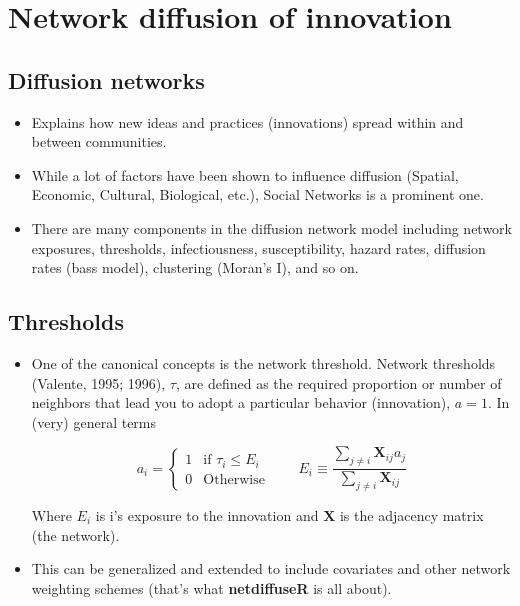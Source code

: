 \documentclass[]{book}
\begin{document}
\hypertarget{network-diffusion-of-innovation}{%
\section{Network diffusion of innovation}\label{network-diffusion-of-innovation}}

\hypertarget{diffusion-networks}{%
\subsection{Diffusion networks}\label{diffusion-networks}}

\begin{itemize}
\item
  Explains how new ideas and practices (innovations) spread within and between
  communities.
\item
  While a lot of factors have been shown to influence diffusion (Spatial,
  Economic, Cultural, Biological, etc.), Social Networks is a prominent one.
\item
  There are many components in the diffusion network model including network exposures, thresholds, infectiousness, susceptibility, hazard rates, diffusion rates (bass model), clustering (Moran's I), and so on.
\end{itemize}

\hypertarget{thresholds}{%
\subsection{Thresholds}\label{thresholds}}

\begin{itemize}
\item
  One of the canonical concepts is the network threshold. Network thresholds (Valente, 1995; 1996), \(\tau\), are defined as the required proportion or number of neighbors that lead you to adopt a particular behavior (innovation), \(a=1\). In (very) general terms

  \[
  a_i = \left\{\begin{array}{ll}
  1 &\mbox{if } \tau_i\leq E_i \\
  0 & \mbox{Otherwise}
  \end{array}\right. \qquad
  E_i \equiv \frac{\sum_{j\neq i}\mathbf{X}_{ij}a_j}{\sum_{j\neq i}\mathbf{X}_{ij}}
  \]

  Where \(E_i\) is i's exposure to the innovation and \(\mathbf{X}\) is the adjacency matrix (the network).
\item
  This can be generalized and extended to include covariates and other network weighting schemes (that's what \textbf{netdiffuseR} is all about).
\end{itemize}
\end{document}

